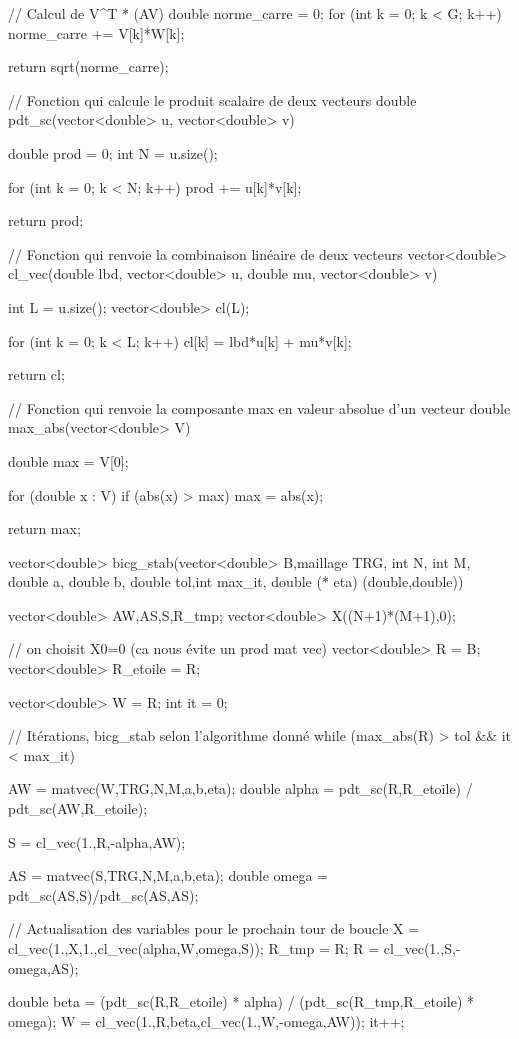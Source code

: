 \begin{codeblock}
{{    // Calcul de V^T * (AV)
    double norme_carre = 0;
    for (int k = 0; k < G; k++)
        norme_carre += V[k]*W[k];

    return sqrt(norme_carre);
}

// Fonction qui calcule le produit scalaire de deux vecteurs
double pdt_sc(vector<double> u, vector<double> v){
    double prod = 0;
    int N = u.size();

    for (int k = 0; k < N; k++){
        prod += u[k]*v[k];
    }

    return prod;
}

// Fonction qui renvoie la combinaison linéaire de deux vecteurs
vector<double> cl_vec(double lbd, vector<double> u, double mu, vector<double> v){
    int L = u.size();
    vector<double> cl(L);

    for (int k = 0; k < L; k++){
        cl[k] = lbd*u[k] + mu*v[k];
    }

    return cl;
}


// Fonction qui renvoie la composante max en valeur absolue d'un vecteur
double max_abs(vector<double> V){
    double max = V[0];

    for (double x : V)
        if (abs(x) > max) max = abs(x);

    return max;
}

vector<double> bicg_stab(vector<double> B,maillage TRG, int N, int M, double a,
    double b, double tol,int max_it, double (* eta) (double,double)){

    vector<double> AW,AS,S,R_tmp;
    vector<double> X((N+1)*(M+1),0);

    // on choisit X0=0 (ca nous évite un prod mat vec)
    vector<double> R = B;
    vector<double> R_etoile = R;


    vector<double> W = R;
    int it = 0;

    // Itérations, bicg_stab selon l'algorithme donné
    while (max_abs(R) > tol && it < max_it){
        AW = matvec(W,TRG,N,M,a,b,eta);
        double alpha = pdt_sc(R,R_etoile) / pdt_sc(AW,R_etoile);

        S = cl_vec(1.,R,-alpha,AW);

        AS = matvec(S,TRG,N,M,a,b,eta);
        double omega = pdt_sc(AS,S)/pdt_sc(AS,AS);

        // Actualisation des variables pour le prochain tour de boucle
        X = cl_vec(1.,X,1.,cl_vec(alpha,W,omega,S));
        R_tmp = R;
        R = cl_vec(1.,S,-omega,AS);

        double beta = (pdt_sc(R,R_etoile) * alpha) / (pdt_sc(R_tmp,R_etoile) * omega);
        W = cl_vec(1.,R,beta,cl_vec(1.,W,-omega,AW));
        it++;
    }

}}
\end{codeblock}

